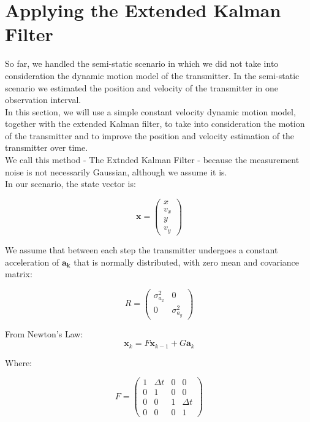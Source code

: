 \section{Applying the Extended Kalman Filter}
\label{applying_kalman}
So far, we handled the semi-static scenario in which we did not take into consideration
the dynamic motion model of the transmitter. In the semi-static scenario we estimated
the position and velocity of the transmitter in one observation interval.\\
In this section, we will use a simple constant velocity dynamic motion model, together
with the extended Kalman filter, to take into consideration the motion of the transmitter
and to improve the position and velocity estimation of the transmitter over time.\\
We call this method - The Extnded Kalman Filter - because the measurement noise is not
necessarily Gaussian, although we assume it is.\\
In our scenario, the state vector is:

\begin{equation}
\mathbf{x} = \begin{pmatrix}x \\ v_x \\ y \\ v_y\end{pmatrix}
\end{equation}

We assume that between each step the transmitter undergoes a constant acceleration of $\mathbf{a_k}$ that is normally distributed, with zero mean and covariance matrix:

\begin{equation}
R = \begin{pmatrix} \sigma^2_{a_x} & 0 \\ 0 & \sigma^2_{a_y} \end{pmatrix}
\end{equation}

From Newton's Law:
\begin{equation}
\mathbf{x}_k = F \mathbf{x}_{k-1}+G\mathbf{a}_k
\end{equation}

Where:

\begin{equation}
F = 
\begin{pmatrix}
1 & \Delta t & 0 & 0\\
0 & 1 & 0 & 0\\
0& 0& 1 & \Delta t\\
0& 0& 0& 1
\end{pmatrix}
\end{equation}

